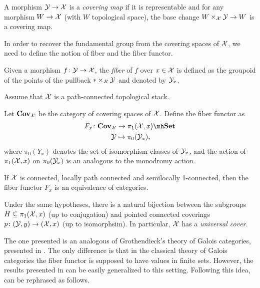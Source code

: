 \begin{defi}\cite[Definition 18.10]{Noohi-foundations}
A morphism $\mathcal{Y} \to \mathcal{X}$ is a \textit{covering map} if it is representable and for any morphism $W \to \mathcal{X}$ (with $W$ topological space), the base change $ W \times_{\mathcal{X}} \mathcal{Y} \to W $ is a covering map.
\end{defi}

In order to recover the fundamental group from the covering spaces of $\mathcal{X}$, we need to define the notion of fiber and the fiber functor.

\begin{defi}\cite[Definition 18.13]{Noohi-foundations}
Given a morphism $f \colon \mathcal{Y} \to \mathcal{X}$, the \textit{fiber} of $f$ over $x \in \mathcal{X}$ is defined as the groupoid of the points of the pullback $* \times_{\mathcal{X}} \mathcal{Y}$ and denoted by $\mathcal{Y}_x$.
\end{defi}

Assume that $\mathcal{X}$ is a path-connected topological stack.

\begin{defi}\cite[Definition 18.13]{Noohi-foundations}
Let $\mathbf{Cov}_{\mathcal{X}}$ be the category of covering spaces of $\mathcal{X}$.
Define the fiber functor as 
\begin{align}
    F_x \colon \Cov_\Xc &\to \pi_1(\Xc, x)\mh\Set \\
                \Yc &\mapsto \pi_0(\Yc_x),
\end{align}
where $\pi_0(Y_x)$ denotes the set of isomorphism classes of $\mathcal{Y}_x$, and the action of $\pi_1(\mathcal{X}, x)$ on $\pi_0(\mathcal{Y}_x)$ is an analogous to the monodromy action.
\end{defi}

\begin{thm}\cite[Theorem 18.19]{Noohi-foundations}\label{fiber functor equivalence}
If $\mathcal{X}$ is connected, locally path connected and semilocally 1-connected, then the fiber functor $F_x$ is an equivalence of categories.
\end{thm}

\begin{cor}\cite[Corollary 18.20]{Noohi-foundations}
Under the same hypotheses, there is a natural bijection between the subgroups $H \subseteq \pi_1(\mathcal{X}, x)$ (up to conjugation) and pointed connected coverings $p \colon (\mathcal{Y}, y) \to (\mathcal{X}, x)$ (up to isomorphsim). In particular, $\mathcal{X}$ has a \textit{universal cover}.
\end{cor}

\begin{rmk}
The one presented is an analogous of Grothendieck's theory of Galois categories, presented in \cite{SGA1-IX}. The only difference is that in the classical theory of Galois categories the fiber functor is supposed to have values in finite sets. However, the results presented in \cite{SGA1-IX} can be easily generalized to this setting. Following this idea,  can be rephrased as follows.
\end{rmk}

